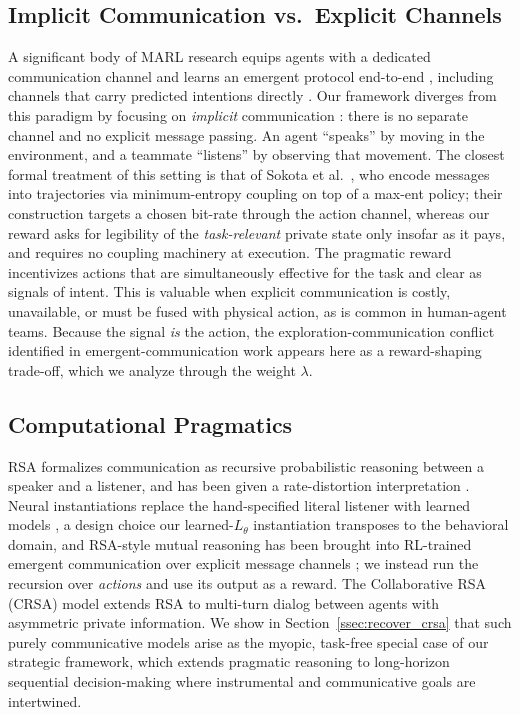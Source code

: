 \documentclass{article}
\newcommand{\Ltheta}{L_\theta}
\begin{document}
\subsection{Implicit Communication vs.\ Explicit Channels}

A significant body of MARL research equips agents with a dedicated communication channel and learns an emergent protocol end-to-end \cite{foerster2016learning,sukhbaatar2016learning,boldt2024review}, including channels that carry predicted intentions directly \cite{kim2021communication}. Our framework diverges from this paradigm by focusing on \emph{implicit} communication \cite{knepper2017implicit}: there is no separate channel and no explicit message passing. An agent ``speaks'' by moving in the environment, and a teammate ``listens'' by observing that movement. The closest formal treatment of this setting is that of Sokota et al.~\cite{sokota2022communicating}, who encode messages into trajectories via minimum-entropy coupling on top of a max-ent policy; their construction targets a chosen bit-rate through the action channel, whereas our reward asks for legibility of the \emph{task-relevant} private state only insofar as it pays, and requires no coupling machinery at execution. The pragmatic reward incentivizes actions that are simultaneously effective for the task and clear as signals of intent. This is valuable when explicit communication is costly, unavailable, or must be fused with physical action, as is common in human-agent teams. Because the signal \emph{is} the action, the exploration-communication conflict identified in emergent-communication work \cite{eccles2019biases,sad} appears here as a reward-shaping trade-off, which we analyze through the weight $\lambda$.

\subsection{Computational Pragmatics}

RSA \cite{goodman2016pragmatic} formalizes communication as recursive probabilistic reasoning between a speaker and a listener, and has been given a rate-distortion interpretation \cite{zaslavsky2021rate}. Neural instantiations replace the hand-specified literal listener with learned models \cite{monroe2015learning,andreas2016reasoning,fried2018unified}, a design choice our learned-$\Ltheta$ instantiation transposes to the behavioral domain, and RSA-style mutual reasoning has been brought into RL-trained emergent communication over explicit message channels \cite{kang2020pragmatic}; we instead run the recursion over \emph{actions} and use its output as a reward. The Collaborative RSA (CRSA) model \cite{estienne2025collaborative} extends RSA to multi-turn dialog between agents with asymmetric private information. We show in Section~\ref{ssec:recover_crsa} that such purely communicative models arise as the myopic, task-free special case of our strategic framework, which extends pragmatic reasoning to long-horizon sequential decision-making where instrumental and communicative goals are intertwined.
\end{document}

